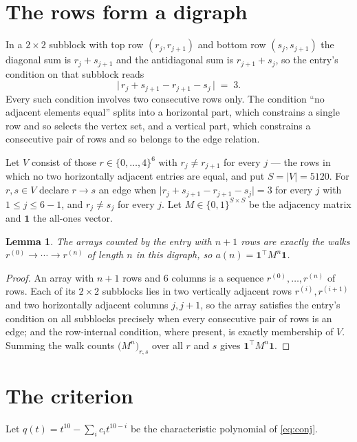 \documentclass[11pt,a4paper]{article}
\theoremstyle{plain}
\newtheorem{lemma}[theorem]{Lemma}
\theoremstyle{definition}
\begin{document}
\section{The rows form a digraph}

In a $2\times2$ subblock with top row $(r_j,r_{j+1})$ and bottom row $(s_j,s_{j+1})$ the
diagonal sum is $r_j+s_{j+1}$ and the antidiagonal sum is $r_{j+1}+s_j$, so the entry's
condition on that subblock reads
\[
\bigl|\,r_j+s_{j+1}-r_{j+1}-s_j\,\bigr|\;=\;3.
\]
Every such condition involves two consecutive rows only. The condition ``no adjacent elements equal'' splits into a horizontal
part, which constrains a single row and so selects the vertex set, and a vertical part,
which constrains a consecutive pair of rows and so belongs to the edge relation.

Let $V$ consist of those $r\in\{0,\dots,4\}^{6}$ with $r_j\ne r_{j+1}$ for every
$j$ --- the rows in which no two horizontally adjacent entries are equal, and put $S=|V|=5120$. For $r,s\in V$ declare $r\to s$ an edge
when $\bigl|r_j+s_{j+1}-r_{j+1}-s_j\bigr|=3$ for every $j$ with
$1\le j\le6-1$, and $r_j\ne s_j$ for every $j$. Let $M\in\{0,1\}^{S\times S}$ be the adjacency matrix and $\mathbf{1}$
the all-ones vector.

\begin{lemma}\label{lem:walk}
The arrays counted by the entry with $n+1$ rows are exactly the walks
$r^{(0)}\to\cdots\to r^{(n)}$ of length $n$ in this digraph, so
$a(n)=\mathbf{1}^{\!\top}M^{n}\mathbf{1}$.
\end{lemma}

\begin{proof}
An array with $n+1$ rows and $6$ columns is a sequence $r^{(0)},\dots,r^{(n)}$ of
rows. Each of its $2\times2$ subblocks lies in two vertically adjacent rows
$r^{(i)},r^{(i+1)}$ and two horizontally adjacent columns $j,j+1$, so the array satisfies
the entry's condition on all subblocks precisely when every consecutive pair of rows is an
edge; and the row-internal condition, where present, is exactly membership of $V$. Summing
the walk counts $\bigl(M^{n}\bigr)_{r,s}$ over all $r$ and $s$ gives
$\mathbf{1}^{\!\top}M^{n}\mathbf{1}$.
\end{proof}

\section{The criterion}

Let $q(t)=t^{10}-\sum_i c_i t^{10-i}$ be the characteristic polynomial of
\eqref{eq:conj}.
\end{document}
